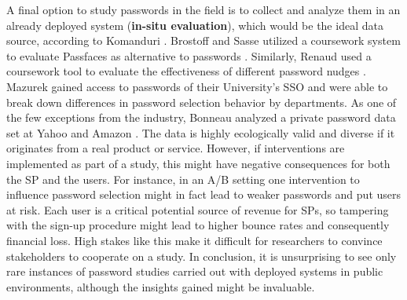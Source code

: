 A final option to study passwords in the field is to collect and analyze them in an already deployed system (\textbf{in-situ evaluation}), which would be the ideal data source, according to Komanduri \etal \cite{Komanduri2011OfPasswordsAndPeople}. Brostoff and Sasse utilized a coursework system to evaluate Passfaces as alternative to passwords \cite{Brostoff2000PassfacesEvaluation}. Similarly, Renaud \etal used a coursework tool to evaluate the effectiveness of different password nudges \cite{Renaud2017LessonsLearnedNudges}. Mazurek \etal gained access to passwords of their University's \gls{SSO} and were able to break down differences in password selection behavior by departments. As one of the few exceptions from the industry, Bonneau analyzed a private password data set at Yahoo \cite{Bonneau2012ScienceOfGuessing} and Amazon \cite{Bonneau2012LinguisticProperties}. The data is highly ecologically valid and diverse if it originates from a real product or service. 
However, if interventions are implemented as part of a study, this might have negative consequences for both the \gls{SP} and the users. For instance, in an A/B setting one intervention to influence password selection might in fact lead to weaker passwords and put users at risk. Each user is a critical potential source of revenue for \glspl{SP}, so tampering with the sign-up procedure might lead to higher bounce rates and consequently financial loss. High stakes like this make it difficult for researchers to convince stakeholders to cooperate on a study. In conclusion, it is unsurprising to see only rare instances of password studies carried out with deployed systems in public environments, although the insights gained might be invaluable.


